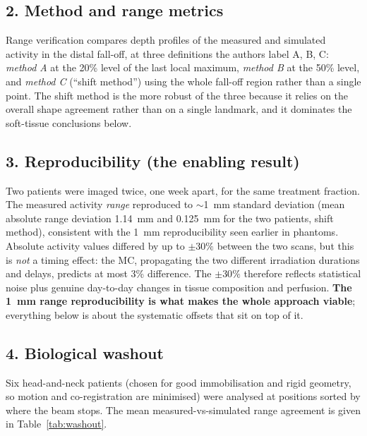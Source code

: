 \documentclass[11pt]{article}
\begin{document}
\subsection*{2. Method and range metrics}

Range verification compares depth profiles of the measured and simulated
activity in the distal fall-off, at three definitions the authors label A, B, C:
\emph{method A} at the 20\% level of the last local maximum, \emph{method B} at
the 50\% level, and \emph{method C} (``shift method'') using the whole fall-off
region rather than a single point. The shift method is the more robust of the
three because it relies on the overall shape agreement rather than on a single
landmark, and it dominates the soft-tissue conclusions below.

\subsection*{3. Reproducibility (the enabling result)}

Two patients were imaged twice, one week apart, for the same treatment fraction.
The measured activity \emph{range} reproduced to $\sim$1~mm standard deviation
(mean absolute range deviation 1.14~mm and 0.125~mm for the two patients, shift
method), consistent with the 1~mm reproducibility seen earlier in phantoms.
Absolute activity values differed by up to $\pm30\%$ between the two scans, but
this is \emph{not} a timing effect: the MC, propagating the two different
irradiation durations and delays, predicts at most 3\% difference. The $\pm30\%$
therefore reflects statistical noise plus genuine day-to-day changes in tissue
composition and perfusion. \textbf{The 1~mm range reproducibility is what makes
the whole approach viable}; everything below is about the systematic offsets that
sit on top of it.

\subsection*{4. Biological washout}

Six head-and-neck patients (chosen for good immobilisation and rigid geometry, so
motion and co-registration are minimised) were analysed at positions sorted by
where the beam stops. The mean measured-vs-simulated range agreement is given in
Table~\ref{tab:washout}.
\end{document}
